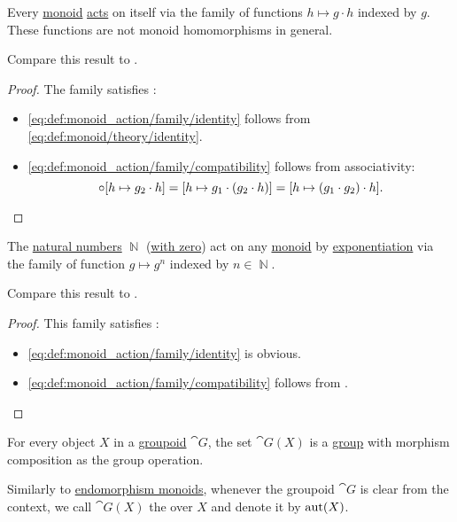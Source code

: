 \begin{proposition}\label{thm:monoid_is_action}
  Every \hyperref[def:monoid]{monoid} \hyperref[def:monoid_action]{acts} on itself via the family of functions \( h \mapsto g \cdot h \) indexed by \( g \). These functions are not monoid homomorphisms in general.

  Compare this result to .
\end{proposition}
\begin{proof}
  The family satisfies :
  \begin{itemize}
    \item \ref{eq:def:monoid_action/family/identity} follows from \eqref{eq:def:monoid/theory/identity}.

    \item \ref{eq:def:monoid_action/family/compatibility} follows from associativity:
    \begin{equation*}
      [h \mapsto g_1 \cdot h] \bincirc [h \mapsto g_2 \cdot h] = [h \mapsto g_1 \cdot (g_2 \cdot h)] = [h \mapsto (g_1 \cdot g_2) \cdot h].
    \end{equation*}
  \end{itemize}
\end{proof}

\begin{proposition}\label{thm:exponentiation_monoid_action}
  The \hyperref[def:natural_numbers]{natural numbers} \( \BbbN \) (\hyperref[rem:peano_arithmetic_zero]{with zero}) act on any \hyperref[def:monoid]{monoid} by \hyperref[def:monoid/exponentiation]{exponentiation} via the family of function \( g \mapsto g^n \) indexed by \( n \in \BbbN \).

  Compare this result to .
\end{proposition}
\begin{proof}
  This family satisfies :
  \begin{itemize}
    \item \ref{eq:def:monoid_action/family/identity} is obvious.
    \item \ref{eq:def:monoid_action/family/compatibility} follows from .
  \end{itemize}
\end{proof}

\begin{definition}\label{def:automorphism_group}
  For every object \( X \) in a \hyperref[def:groupoid]{groupoid} \( \cat{G} \), the set \( \cat{G}(X) \) is a \hyperref[def:group]{group} with morphism composition as the group operation.

  Similarly to \hyperref[def:endomorphism_monoid]{endomorphism monoids}, whenever the groupoid \( \cat{G} \) is clear from the context, we call \( \cat{G}(X) \) the  over \( X \) and denote it by \( \operatorname{aut}(X) \).
\end{definition}

